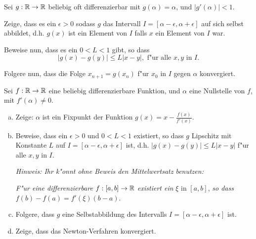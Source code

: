 \documentclass[a4paper,10pt]{article}
\begin{document}
\begin{Aufg}
 Sei $g:\mathbb{R} \to \mathbb{R}$ beliebig oft differenzierbar mit $g(\alpha) = \alpha$, und
 $|g'(\alpha)| <1$. 
 
 Zeige, dass es ein $\epsilon > 0$ sodass $g$ das Intervall 
 $I=\left[ \alpha - \epsilon , \alpha + \epsilon \right]$ auf sich selbst abbildet, d.h. 
 $g(x)$ ist ein Element von $I$ falls $x$ ein Element von $I$ war.
 
 Beweise nun, dass es ein $0<L<1$ gibt, so dass
 \[
  |g(x) - g(y)| \leq L|x-y|, \text{ f"ur alle } x,y \text{ in } I.
 \]

 Folgere nun, dass die Folge $x_{n+1} = g(x_n)$ f"ur $x_0$ in $I$ gegen $\alpha$
 konvergiert.

\end{Aufg}


\begin{Aufg}
 Sei $f: \mathbb{R} \to \mathbb{R}$ eine beliebig differenzierbare Funktion, und $\alpha$ eine Nullstelle von $f$,
 mit $f'(\alpha) \neq 0$.
 \begin{enumerate}[(a)]
  \item Zeige: $\alpha$ ist ein Fixpunkt der Funktion $g(x)= x - \frac{f(x)}{f'(x)}$.
  \item Beweise, dass ein $\epsilon > 0$ und $0<L<1$ existiert, so dass $g$ Lipschitz 
  mit Konstante $L$ auf 
  $I=\left[ \alpha - \epsilon , \alpha + \epsilon \right]$ ist, d.h. 
  $|g(x) - g(y)| \leq L|x-y|$ f"ur alle $x,y$ in $I$.
  
  \textit{
  Hinweis: Ihr k"onnt ohne Beweis den Mittelwertsatz benutzen: }
  
\textit{  F"ur eine differenzierbare}
  $f:\left[ a, b \right] \to \mathbb{R}$ \textit{existiert ein }$\xi$ in $\left[ a, b \right]$,
  \textit{so dass}
  $f(b) - f(a) = f'(\xi)(b-a)$.
  \item Folgere, dass $g$ eine Selbstabbildung des Intervalls
  $I=\left[ \alpha - \epsilon , \alpha + \epsilon \right]$ ist.
  \item Zeige, dass das Newton-Verfahren konvergiert.
 \end{enumerate}

\end{Aufg}
\end{document}
